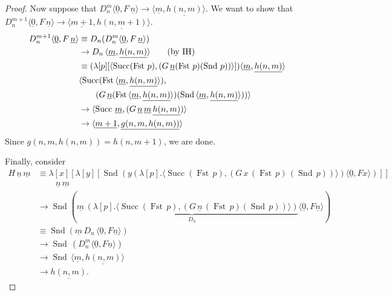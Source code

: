 \documentclass[10pt,a4paper]{article}
\theoremstyle{plain}
\theoremstyle{definition}
\theoremstyle{remark}
\providecommand{\tuple}[1]{\langle #1 \rangle}
\providecommand{\num}[1]{\underline{#1}}
\providecommand{\lambd}{\ensuremath{\lambda}}
\providecommand{\redone}{}
\providecommand{\ident}{\operatorname{id}}
\providecommand{\red}{\mathrel{\rightarrow}}
\providecommand{\fn}[1]{\operatorname{#1}}
\providecommand{\ident}{}
\renewcommand{\ident}{\equiv}
\providecommand{\num}{}
\providecommand{\lambd}{}
\providecommand{\red}{}
\providecommand{\redone}{}
\begin{document}
\begin{proof}
  Now suppose that $D_n^m \tuple{\num{0}, F\, \num{n}} \red
  \tuple{\num{m}, \num{h(n, m)}}$. We want to
  show that $D_n^{m+1} \tuple{\num{0}, F\, \num{n}} \red
  \tuple{\num{m+1}, \num{h(n, m+1)}}$.
  \begin{align*}
    D_n^{m+1} \tuple{\num{0}, F\, \num{n}}
    & \ident D_n(D_n^{m} \tuple{\num{0}, F\, \num{n}})\\
    & \red D_n\,\tuple{\num{m}, \num{h(n, m)}} \text{\qquad (by IH)}\\
    & \ident (\lambd[p][
      \tuple{
        \fn{Succ} (\fn{Fst}\, p), (G \, \num{n} (\fn{Fst}\, p) (\fn{Snd}\, p))
    }]) \tuple{\num{m}, \num{h(n,m)}}\\
    & \redone
    \tuple{\fn{Succ} (\fn{Fst}\, \tuple{\num{m}, \num{h(n,m)}}),\\
      & \qquad (G \, \num{n} (\fn{Fst}\, \tuple{\num{m}, \num{h(n,m)}}) (\fn{Snd}\, \tuple{\num{m}, \num{h(n,m)}}))}\\
    & \red 
    \tuple{\fn{Succ}\, \num{m}, (G \, \num{n} \,\num{m} \, \num{h(n,m)})}\\
    & \red \tuple{\num{m+1}, \num{g(n, m, h(n, m))}}
  \end{align*}
  Since $g(n, m, h(n, m)) = h(n, m+1)$, we are done.

  Finally, consider
  \begin{align*}
    H\,\num n\,\num m &\ident \lambd[x][\lambd[y][\fn{Snd} (y
        (\lambd[p].\tuple{\fn{Succ} (\fn{Fst}\, p), (G\, x\,
          (\fn{Fst}\, p)\, (\fn{Snd}\, p))}) \tuple{\num{0}, F x})]]\\
    & \qquad\,\num n\, \num m\\
    & \red \fn{Snd} (\num m \,
    \underbrace{(\lambd[p].\tuple{\fn{Succ} (\fn{Fst}\, p), (G \,\num n\,
      (\fn{Fst}\, p) (\fn{Snd}\, p))})}_{D_n} \tuple{\num{0}, F \num n})\\
    & \ident \fn{Snd} (\num m \, D_n\, \tuple{\num{0}, F \num n})\\
    & \red \fn{Snd} \,(D_n^m  \tuple{\num{0}, F \num n})\\
    & \red \fn{Snd} \,\tuple{\num{m}, \num{h(n, m)}} \\
    & \red \num{h(n,m)}. 
  \end{align*}  
\end{proof}
\end{document}
